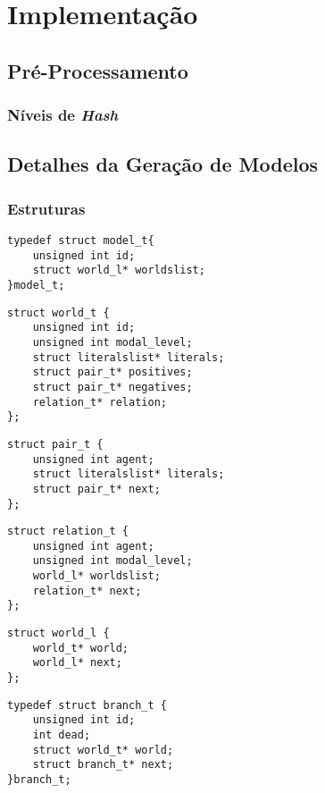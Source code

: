 \chapter{Implementação}
\label{cap:impl}

\section{Pré-Processamento}
\label{sec:pré-processamento}

\subsection{Níveis de \textit{Hash}}
\label{sub:n_veis_de_hash}


\section{Detalhes da Geração de Modelos}
\subsection{Estruturas}
\label{subsec:estruturas}


\begin{lstlisting}[frame=single]
typedef struct model_t{ 
    unsigned int id;
    struct world_l* worldslist;
}model_t;
\end{lstlisting}

\begin{lstlisting}[frame=single]
struct world_t {
    unsigned int id;
    unsigned int modal_level;
    struct literalslist* literals;
    struct pair_t* positives;
    struct pair_t* negatives;
    relation_t* relation;
};
\end{lstlisting}

\begin{lstlisting}[frame=single]
struct pair_t {
    unsigned int agent;
    struct literalslist* literals;
    struct pair_t* next;
};
\end{lstlisting}

\begin{lstlisting}[frame=single]
struct relation_t {
    unsigned int agent;
    unsigned int modal_level;
    world_l* worldslist;
    relation_t* next;
};
\end{lstlisting}

\begin{lstlisting}[frame=single]
struct world_l {
    world_t* world;
    world_l* next;
};
\end{lstlisting}

\begin{lstlisting}[frame=single]
typedef struct branch_t {
    unsigned int id;
    int dead;
    struct world_t* world;
    struct branch_t* next;
}branch_t;
\end{lstlisting}






